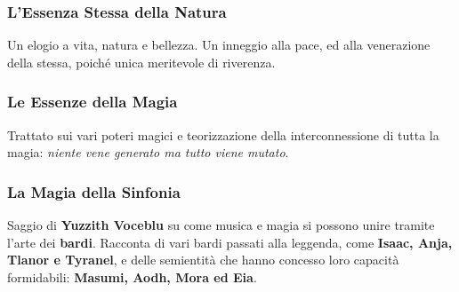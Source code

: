 \documentclass[10pt,twoside,onecolumn,openany]{book}
\begin{document}
\subsubsection{L'Essenza Stessa della Natura} Un elogio a vita, natura e bellezza. Un inneggio alla pace, ed alla venerazione della stessa, poiché unica meritevole di riverenza.
\subsubsection{Le Essenze della Magia} Trattato sui vari poteri magici e teorizzazione della interconnessione di tutta la magia: \textit{niente vene generato ma tutto viene mutato}.
\subsubsection{La Magia della Sinfonia} Saggio di \textbf{Yuzzith Voceblu} su come musica e magia si possono unire tramite l'arte dei \textbf{bardi}. Racconta di vari bardi passati alla leggenda, come \textbf{Isaac, Anja, Tlanor e Tyranel}, e delle semientità che hanno concesso loro capacità formidabili: \textbf{Masumi, Aodh, Mora ed Eia}.
\end{document}
